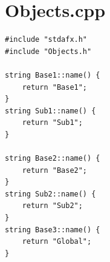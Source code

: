 \documentclass[12pt]{article}
\begin{document}
\newpage
\section{Objects.cpp}

\begin{verbatim}
#include "stdafx.h"
#include "Objects.h"

string Base1::name() {
	return "Base1";
}
string Sub1::name() {
	return "Sub1";
}

string Base2::name() {
	return "Base2";
}
string Sub2::name() {
	return "Sub2";
}
string Base3::name() {
	return "Global";
}
\end{verbatim}
\end{document}

